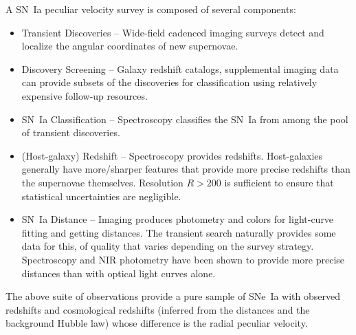 A SN~Ia peculiar velocity survey is composed of several components:
\begin{itemize}
\item Transient Discoveries -- Wide-field cadenced imaging surveys detect and localize the angular coordinates of new supernovae.
\item Discovery Screening -- Galaxy redshift catalogs, supplemental imaging data can provide subsets of the discoveries for classification
using relatively expensive follow-up resources.
\item SN~Ia Classification -- Spectroscopy classifies the SN~Ia from among the pool of  transient discoveries. 
\item (Host-galaxy) Redshift -- Spectroscopy provides redshifts. 
Host-galaxies generally have more/sharper features that provide more precise redshifts than the supernovae themselves. Resolution $R>200$
is sufficient to ensure that statistical uncertainties are negligible.
\item SN~Ia Distance -- Imaging produces photometry and colors for light-curve fitting and getting distances.  The transient search naturally provides some data
for this, of quality that varies depending on the survey strategy.
Spectroscopy and NIR photometry
have been shown to provide more precise distances than with optical light curves alone.
\end{itemize}
The above suite of observations provide a pure sample of SNe~Ia with observed redshifts and cosmological redshifts (inferred from the distances and
the background Hubble law)
whose difference is the radial peculiar velocity.


